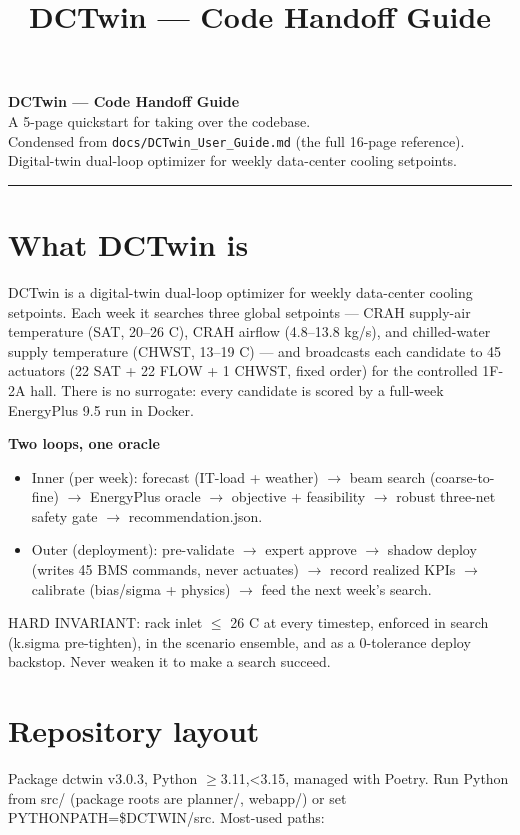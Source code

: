 \documentclass[10pt]{article}
\title{\vspace{-1.2cm}\textbf{DCTwin --- Code Handoff Guide}}
\author{}\date{}
\begin{document}
\begin{center}
{\LARGE\bfseries\color{nv} DCTwin --- Code Handoff Guide}\\[3pt]
{\normalsize A 5-page quickstart for taking over the codebase.}\\[1pt]
{\small Condensed from \texttt{docs/DCTwin\_User\_Guide.md} (the full 16-page reference). Digital-twin dual-loop optimizer for weekly data-center cooling setpoints.}
\end{center}
\vspace{2pt}\hrule\vspace{4pt}
\section*{What DCTwin is}
DCTwin is a digital-twin dual-loop optimizer for weekly data-center cooling setpoints. Each week it searches three global setpoints — CRAH supply-air temperature (SAT, 20–26 C), CRAH airflow (4.8–13.8 kg/\allowbreak{}s), and chilled-water supply temperature (CHWST, 13–19 C) — and broadcasts each candidate to 45 actuators (22 SAT + 22 FLOW + 1 CHWST, fixed order) for the controlled 1F-2A hall. There is no surrogate: every candidate is scored by a full-week EnergyPlus 9.5 run in Docker.

\smallskip\noindent\textbf{Two loops, one oracle}\\[1pt]
\begin{itemize}
\item Inner (per week): forecast (IT-load + weather) $\rightarrow$ beam search (coarse-to-fine) $\rightarrow$ EnergyPlus oracle $\rightarrow$ objective + feasibility $\rightarrow$ robust three-net safety gate $\rightarrow$ recommendation.json.
\item Outer (deployment): pre-validate $\rightarrow$ expert approve $\rightarrow$ shadow deploy (writes 45 BMS commands, never actuates) $\rightarrow$ record realized KPIs $\rightarrow$ calibrate (bias/\allowbreak{}sigma + physics) $\rightarrow$ feed the next week's search.
\end{itemize}
HARD INVARIANT: rack inlet $\leq$ 26 C at every timestep, enforced in search (k.sigma pre-tighten), in the scenario ensemble, and as a 0-tolerance deploy backstop. Never weaken it to make a search succeed.


\section*{Repository layout}
Package dctwin v3.0.3, Python $\geq$3.11,<3.15, managed with Poetry. Run Python from src/\allowbreak{} (package roots are planner/\allowbreak{}, webapp/\allowbreak{}) or set PYTHONPATH=\$DCTWIN/\allowbreak{}src. Most-used paths:
\end{document}
